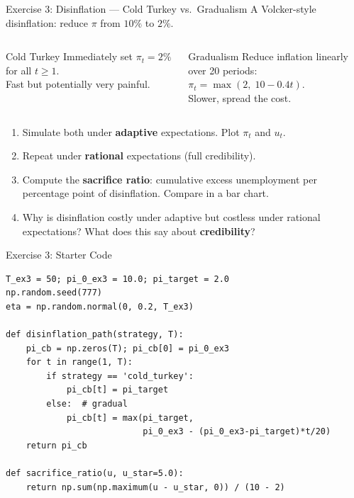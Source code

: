 \documentclass[aspectratio=169, 10pt]{beamer}
\begin{document}
\begin{frame}{Exercise 3: Disinflation --- Cold Turkey vs.\ Gradualism}
A Volcker-style disinflation: reduce $\pi$ from $10\%$ to $2\%$.
\vspace{0.3em}
\begin{columns}[T]
\begin{block}{Cold Turkey}
Immediately set $\pi_t = 2\%$ for all $t \geq 1$.\\
Fast but potentially very painful.
\end{block}
\begin{block}{Gradualism}
Reduce inflation linearly over 20 periods:\\
$\pi_t = \max(2,\; 10 - 0.4t)$.\\
Slower, spread the cost.
\end{block}
\end{columns}
\vspace{0.3em}
\begin{enumerate}
  \item[(a)] Simulate both under \textbf{adaptive} expectations. Plot $\pi_t$ and $u_t$.
  \item[(b)] Repeat under \textbf{rational} expectations (full credibility).
  \item[(c)] Compute the \textbf{sacrifice ratio}: cumulative excess unemployment
        per percentage point of disinflation. Compare in a bar chart.
  \item[(d)] Why is disinflation costly under adaptive but costless under rational
        expectations? What does this say about \textbf{credibility}?
\end{enumerate}
\end{frame}

\begin{frame}[fragile]{Exercise 3: Starter Code}
\begin{lstlisting}
T_ex3 = 50; pi_0_ex3 = 10.0; pi_target = 2.0
np.random.seed(777)
eta = np.random.normal(0, 0.2, T_ex3)

def disinflation_path(strategy, T):
    pi_cb = np.zeros(T); pi_cb[0] = pi_0_ex3
    for t in range(1, T):
        if strategy == 'cold_turkey':
            pi_cb[t] = pi_target
        else:  # gradual
            pi_cb[t] = max(pi_target,
                           pi_0_ex3 - (pi_0_ex3-pi_target)*t/20)
    return pi_cb

def sacrifice_ratio(u, u_star=5.0):
    return np.sum(np.maximum(u - u_star, 0)) / (10 - 2)
\end{lstlisting}
\end{frame}
\end{document}

